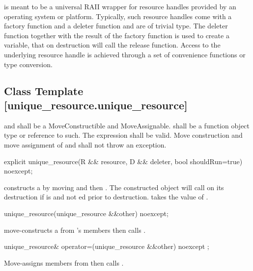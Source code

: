 \documentclass[ebook,11pt,article]{memoir}
\begin{document}
\pnum
\enternote
{} is meant to be a universal RAII wrapper for resource handles provided by an operating system or platform.
Typically, such resource handles come with a factory function and a deleter function and are of trivial type.
The deleter function together with the result of the factory function is used to create a  variable, that on destruction will call the release function. Access to the underlying resource handle is achieved through a set of convenience functions or type conversion.
\exitnote

\subsection {Class Template  [unique_resource.unique_resource]}

\pnum
\requires  {} and  shall be a MoveConstructible and MoveAssignable.
 shall be a function object type or reference to such. 
The expression  shall be valid.
Move construction and move assignment of  and  shall not throw an exception.


\begin{itemdecl}
explicit
unique_resource(R && resource, D && deleter, bool shouldRun=true) noexcept;
\end{itemdecl}

\pnum
\effects constructs a  by moving  and then . The constructed object will call  on its destruction if  is  and not ed prior to destruction.  takes the value of .

\begin{itemdecl}
unique_resource(unique_resource &&other) noexcept;
\end{itemdecl}

\pnum
\effects move-constructs a  from 's members then calls  .

\begin{itemdecl}
unique_resource& operator=(unique_resource  &&other) noexcept ;
\end{itemdecl}

\pnum
\effects {} Move-assigns members from  then calls .
\end{document}
